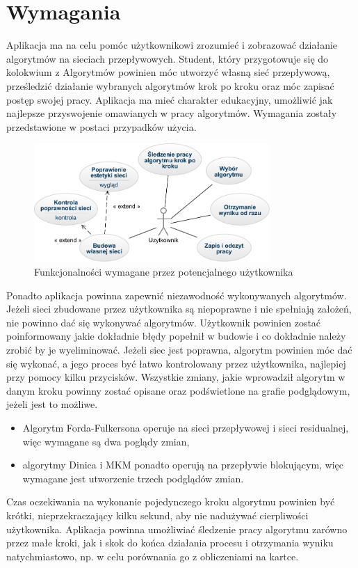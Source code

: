 \chapter{Wymagania}\label{chap:wymagania}
Aplikacja ma na celu pomóc użytkownikowi zrozumieć i zobrazować działanie algorytmów na sieciach przepływowych. Student, który przygotowuje się do kolokwium z Algorytmów powinien móc utworzyć własną sieć przepływową, prześledzić działanie wybranych algorytmów krok po kroku oraz móc zapisać postęp swojej pracy. Aplikacja ma mieć charakter edukacyjny, umożliwić jak najlepsze przyswojenie omawianych w pracy algorytmów. Wymagania zostały przedstawione w postaci przypadków użycia.
\begin{figure}[H]
	\centering
	\includegraphics[width=0.8\textwidth]{./img/user_case2}
	\caption{Funkcjonalności wymagane przez potencjalnego użytkownika}
\end{figure}
Ponadto aplikacja powinna zapewnić niezawodność wykonywanych algorytmów. Jeżeli sieci zbudowane przez użytkownika są niepoprawne i nie spełniają założeń, nie powinno dać się wykonywać algorytmów. Użytkownik powinien zostać poinformowany jakie dokładnie błędy popełnił w budowie i co dokładnie należy zrobić by je wyeliminować. Jeżeli siec jest poprawna, algorytm powinien móc dać się wykonać, a jego proces być łatwo kontrolowany przez użytkownika, najlepiej przy pomocy kilku przycisków. Wszystkie zmiany, jakie wprowadził algorytm w danym kroku powinny zostać opisane oraz podświetlone na grafie podglądowym, jeżeli jest to możliwe.
\begin{itemize}
	\item Algorytm Forda-Fulkersona operuje na sieci przepływowej i sieci residualnej, więc wymagane są dwa poglądy zmian,
	\item algorytmy Dinica i MKM ponadto operują na przepływie blokującym, więc wymagane jest utworzenie trzech podglądów zmian.
\end{itemize}
Czas oczekiwania na wykonanie pojedynczego kroku algorytmu powinien być krótki, nieprzekraczający kilku sekund, aby nie nadużywać cierpliwości użytkownika. Aplikacja powinna umożliwiać śledzenie pracy algorytmu zarówno przez małe kroki, jak i skok do końca działania procesu i otrzymania wyniku natychmiastowo, np. w celu porównania go z obliczeniami na kartce.
